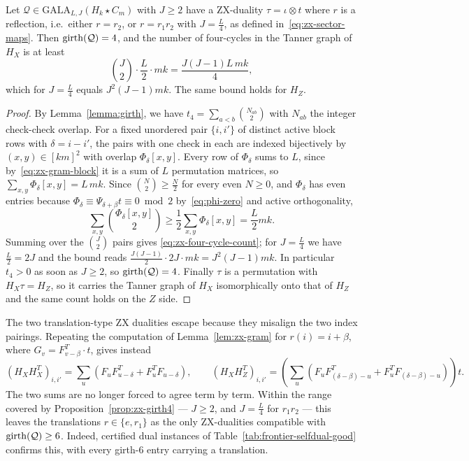 \begin{proposition}\label{prop:zx-girth4}
Let $\mathcal Q\in \mathrm{GALA}_{L,J}(H_k\star C_m)$ with $J\geq 2$ have a ZX-duality $\tau =\iota \otimes t$ where $r$ is a reflection, i.e.\ either $r = r_2$, or $r = r_1r_2$ with $J = \frac L4$, as defined in~\eqref{eq:zx-sector-maps}. Then $\mathrm{girth}(\mathcal{Q}) = 4$, and the number of four-cycles in the Tanner graph of $H_X$ is at least
\begin{equation}\label{eq:zx-four-cycle-count}
    \binom{J}{2}\cdot \frac L2\cdot mk = \frac{J(J-1)L\,mk}{4},
\end{equation}
which for $J = \frac L4$ equals $J^2(J-1)mk$.  The same bound holds for $H_Z$.
\end{proposition}
\begin{proof}
By Lemma~\ref{lemma:girth}, we have $t_4 = \sum_{a<b}\binom{N_{ab}}{2}$ with $N_{ab}$ the integer check-check overlap. For a fixed unordered pair $\{i,i'\}$ of distinct active block rows with $\delta = i - i'$, the pairs with one check in each are indexed bijectively by $(x,y)\in[km]^2$ with overlap $\Phi_\delta[x,y]$. Every row of $\Phi_\delta$ sums to $L$, since by~\eqref{eq:zx-gram-block} it is a sum of $L$ permutation matrices, so $\sum_{x,y}\Phi_\delta[x,y] = L\,mk$. Since $\binom{N}{2}\geq \frac N2$ for every even $N\geq 0$, and $\Phi_\delta$ has even entries because $\Phi_\delta \equiv \Psi_{\delta+\beta}t\equiv 0 \bmod 2$ by~\eqref{eq:phi-zero} and active orthogonality,
\begin{equation*}
    \sum_{x,y}\binom{\Phi_\delta[x,y]}{2}\geq \frac12\sum_{x,y}\Phi_\delta[x,y] =\frac L2mk.
\end{equation*}
Summing over the $\binom J2$ pairs gives \eqref{eq:zx-four-cycle-count}; for $J = \frac L4$ we have $\frac L2 = 2J$ and the bound reads $\frac{J(J-1)}2\cdot 2J\cdot mk = J^2(J-1)mk$. In particular $t_4>0$ as soon as $J\geq2$, so $\mathrm{girth}(\mathcal Q) = 4$. Finally $\tau$ is a permutation with $H_X\tau = H_Z$, so it carries the Tanner graph of $H_X$ isomorphically onto that of $H_Z$ and the same count holds on the $Z$ side.
\end{proof}

The two translation-type ZX dualities escape because they misalign the two index pairings.  Repeating the computation of Lemma~\ref{lem:zx-gram} for $r(i) = i+\beta$, where $G_v = F^T_{v-\beta}\cdot t$, gives instead
\begin{equation}\label{eq:zx-translation}
    \left(H_XH_X^T\right)_{i,i'} = \sum_u \left(F_uF^T_{u-\delta} + F^T_uF_{u-\delta}\right),
    \qquad
    \left(H_XH_Z^T\right)_{i,i'} = \left(\sum_u \left(F_uF^T_{(\delta-\beta)-u} + F^T_uF_{(\delta-\beta)-u}\right)\right)t .
\end{equation}
The two sums are no longer forced to agree term by term. Within the range covered by Proposition~\ref{prop:zx-girth4} --- $J\geq2$, and $J=\tfrac L4$ for $r_1r_2$ --- this leaves the translations $r\in\{e, r_1\}$ as the only ZX-dualities compatible with $\mathrm{girth}(\mathcal Q)\geq 6$. Indeed, certified dual instances of Table~\ref{tab:frontier-selfdual-good} confirms this, with every girth-$6$ entry carrying a translation.
